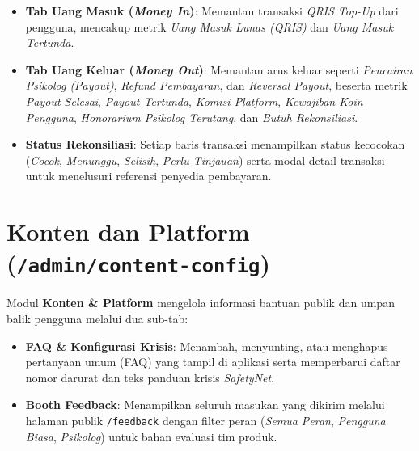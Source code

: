 \begin{itemize}[leftmargin=1.4em]
  \item \textbf{Tab Uang Masuk (\textit{Money In})}: Memantau transaksi \textit{QRIS Top-Up} dari pengguna, mencakup metrik \textit{Uang Masuk Lunas (QRIS)} dan \textit{Uang Masuk Tertunda}.
  \item \textbf{Tab Uang Keluar (\textit{Money Out})}: Memantau arus keluar seperti \textit{Pencairan Psikolog (Payout)}, \textit{Refund Pembayaran}, dan \textit{Reversal Payout}, beserta metrik \textit{Payout Selesai}, \textit{Payout Tertunda}, \textit{Komisi Platform}, \textit{Kewajiban Koin Pengguna}, \textit{Honorarium Psikolog Terutang}, dan \textit{Butuh Rekonsiliasi}.
  \item \textbf{Status Rekonsiliasi}: Setiap baris transaksi menampilkan status kecocokan (\textit{Cocok}, \textit{Menunggu}, \textit{Selisih}, \textit{Perlu Tinjauan}) serta modal detail transaksi untuk menelusuri referensi penyedia pembayaran.
\end{itemize}



\section{Konten dan Platform (\texttt{/admin/content-config})}
Modul \textbf{Konten \& Platform} mengelola informasi bantuan publik dan umpan balik pengguna melalui dua sub-tab:
\begin{itemize}[leftmargin=1.4em]
  \item \textbf{FAQ \& Konfigurasi Krisis}: Menambah, menyunting, atau menghapus pertanyaan umum (FAQ) yang tampil di aplikasi serta memperbarui daftar nomor darurat dan teks panduan krisis \textit{SafetyNet}.
  \item \textbf{Booth Feedback}: Menampilkan seluruh masukan yang dikirim melalui halaman publik \texttt{/feedback} dengan filter peran (\textit{Semua Peran}, \textit{Pengguna Biasa}, \textit{Psikolog}) untuk bahan evaluasi tim produk.
\end{itemize}


